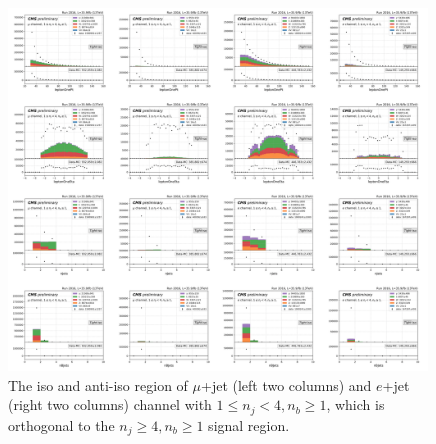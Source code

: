 \begin{figure}
    \centering
    \includegraphics[width=0.99\textwidth]{chapters/Appendix/sectionQCD/figures/ljets_iso_antiiso.png}
    
    
    
    

    \caption{The iso and anti-iso region of $\mu$+jet (left two columns) and $e$+jet (right two columns) channel 
    with $1\leq n_j <4, n_b\geq1$, which is orthogonal to the $n_j\geq4,n_b\geq1$ signal region.
    }
    \label{fig:appendix:123j1b}
\end{figure}


